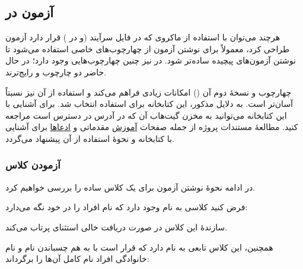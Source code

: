 \documentclass{utap}
\begin{document}
    \subsection{آزمون در }

    هرچند می‌توان با استفاده از ماکروی  که در فایل سرآیند  (و  در ) قرار دارد آزمون طراحی کرد، معمولاً برای نوشتن آزمون از چهارچوب‌های خاصی استفاده می‌شود تا نوشتن آزمون‌های پیچیده ساده‌تر شود. در  نیز چنین چهارچوب‌هایی وجود دارد؛ در حال حاضر دو چارچوب  و  رایج‌ترند.

    چهارچوب  و نسخهٔ دوم آن () امکانات زیادی فراهم می‌کند و استفاده از آن نیز نسبتاً آسان‌تر است.
    به دلایل مذکور، این کتابخانه برای استفاده انتخاب شد.
    برای آشنایی با این کتابخانه می‌توانید به مخزن گیت‌هاب آن که در آدرس  در دسترس است مراجعه کنید.
    مطالعهٔ مستندات پروژه از جمله صفحات \href{https://github.com/catchorg/Catch2/blob/master/docs/tutorial.md}{آموزش} مقدماتی و \href{https://github.com/catchorg/Catch2/blob/master/docs/assertions.md}{ادعاها} برای آشنایی با کتابخانه و نحوهٔ استفاده از آن پیشنهاد می‌گردد.

    \subsubsection{آزمودن کلاس }
    در ادامه نحوهٔ نوشتن آزمون برای یک کلاس ساده را بررسی خواهیم کرد.

    فرض کنید کلاسی به نام  وجود دارد که نام افراد را در خود نگه می‌دارد:
    \begin{latin}\end{latin}

    سازندهٔ این کلاس در صورت دریافت  خالی استثنای  پرتاب می‌کند.

    همچنین، این کلاس تابعی به نام  دارد که قرار است با به هم چسباندن نام و نام خانوادگی افراد نام کامل آن‌ها را برگرداند:
    \begin{latin}\end{latin}
\end{document}
